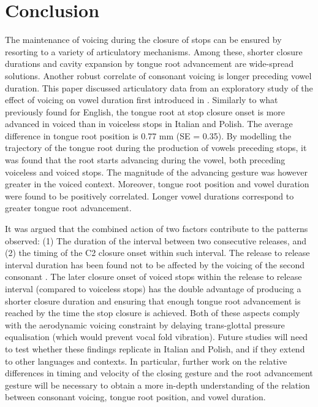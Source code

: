 \documentclass[12pt,]{article}
\begin{document}
\hypertarget{conclusion}{%
\section{Conclusion}\label{conclusion}}

The maintenance of voicing during the closure of stops can be ensured by
resorting to a variety of articulatory mechanisms. Among these, shorter
closure durations and cavity expansion by tongue root advancement are
wide-spread solutions. Another robust correlate of consonant voicing is
longer preceding vowel duration. This paper discussed articulatory data
from an exploratory study of the effect of voicing on vowel duration
first introduced in \citet{coretta2018j}. Similarly to what previously
found for English, the tongue root at stop closure onset is more
advanced in voiced than in voiceless stops in Italian and Polish. The
average difference in tongue root position is 0.77 mm (SE = 0.35). By
modelling the trajectory of the tongue root during the production of
vowels preceding stops, it was found that the root starts advancing
during the vowel, both preceding voiceless and voiced stops. The
magnitude of the advancing gesture was however greater in the voiced
context. Moreover, tongue root position and vowel duration were found to
be positively correlated. Longer vowel durations correspond to greater
tongue root advancement.

It was argued that the combined action of two factors contribute to the
patterns observed: (1) The duration of the interval between two
consecutive releases, and (2) the timing of the C2 closure onset within
such interval. The release to release interval duration has been found
not to be affected by the voicing of the second consonant
\citep{coretta2018j}. The later closure onset of voiced stops within the
release to release interval (compared to voiceless stops) has the double
advantage of producing a shorter closure duration and ensuring that
enough tongue root advancement is reached by the time the stop closure
is achieved. Both of these aspects comply with the aerodynamic voicing
constraint \citep{ohala2011} by delaying trans-glottal pressure
equalisation (which would prevent vocal fold vibration). Future studies
will need to test whether these findings replicate in Italian and
Polish, and if they extend to other languages and contexts. In
particular, further work on the relative differences in timing and
velocity of the closing gesture and the root advancement gesture will be
necessary to obtain a more in-depth understanding of the relation
between consonant voicing, tongue root position, and vowel duration.
\end{document}
